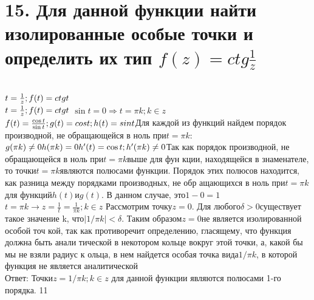 \documentclass{article}
\begin{document}
	\section{15. Для данной функции найти изолированные особые точки и определить
	их тип $f(z) = ctg\frac{1}{z}$}
	\\$t = \frac{1}{z}; f(t) = ctgt
	\vspace{0.4cm}
	$\\$t = \frac{1}{z}; f(t) = ctgt
	\vspace{0.4cm}
	$ $\sin{t} = 0 \Longrightarrow t = \pi k; k\in z $\\$ f(t) = \frac{\cos{t}}{\sin{t}}; g(t)
	= cost; h(t) = sint
	\vspace{0.4cm}
	$Для каждой из функций найдем порядок производной, не обращающейся в ноль при$t
	= \pi k$:
	\vspace{0.4cm}
	\\$ g(\pi k) \neq 0 \\ h(\pi k) = 0 \\ h'(t) = \cos{t}; h'(\pi k) \neq 0
	\vspace{0.4cm}
	$Так как порядок производной, не обращающейся в ноль при$t = \pi k$выше для фун
	кции, находящейся в знаменателе, то точки$t = \pi k$являются полюсами функции.
	Порядок этих полюсов находится, как разница между порядками производных, не обр
	ащающихся в ноль при$t = \pi k$для функций$h(t)$и$g(t)$. В данном случае, это$1
	- 0 = 1$\vspace{0.2cm}$ t = \pi k \longrightarrow z = \frac{1}{t} =
	\frac{1}{\pi k}; k \in z$\vspace{0.4cm}
	Рассмотрим точку$z = 0$. Для любого$\delta>0$существует такое значение k, что$
	| 1/\pi k | < \delta$. Таким образом$z = 0$не является изолированной особой точ
	кой, так как противоречит определению, гласящему, что функция должна быть анали
	тической в некотором кольце вокруг этой точки, а, какой бы мы не взяли радиус к
	ольца, в нем найдется особая точка вида$1/\pi k$, в которой функция не является
	аналитической \\
	\vspace{0.4cm}
	Ответ: Точки$z=1/\pi k;k \in z $ для данной функции являются полюсами 1-го
	порядка. 11
\end{document}
